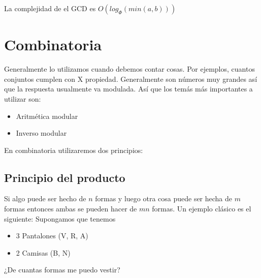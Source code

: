 La complejidad de el GCD es $O(log_{\Phi}( min(a, b) ) )$ 

\section{Combinatoria}
Generalmente lo utilizamos cuando debemos contar cosas. Por ejemplos, cuantos conjuntos cumplen con X propiedad. Generalmente son números muy grandes así que la respuesta usualmente va modulada.
Así que los temás más importantes a utilizar son: \newline
\begin{itemize}
    \item Aritmética modular
    \item Inverso modular
\end{itemize}

En combinatoria utilizaremos dos principios:
\subsection{Principio del producto}
Si algo puede ser hecho de $n$ formas y luego otra cosa puede ser hecha de $m$ formas entonces ambas se pueden hacer de $mn$ formas. Un ejemplo clásico es el siguiente: \newline
Supongamos que tenemos
\begin{itemize}
    \item 3 Pantalones (V, R, A)
    \item 2 Camisas (B, N)
\end{itemize}
¿De cuantas formas me puedo vestir? \newline

